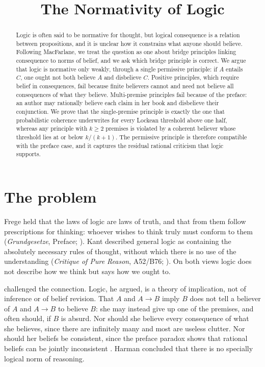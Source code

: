 \documentclass{situationist-preprint}
\title{The Normativity of Logic}
\begin{document}
\maketitle

\begin{abstract}
Logic is often said to be normative for thought, but logical consequence is a relation between propositions, and it is unclear how it constrains what anyone should believe. Following MacFarlane, we treat the question as one about bridge principles linking consequence to norms of belief, and we ask which bridge principle is correct. We argue that logic is normative only weakly, through a single permissive principle: if $A$ entails $C$, one ought not both believe $A$ and disbelieve $C$. Positive principles, which require belief in consequences, fail because finite believers cannot and need not believe all consequences of what they believe. Multi-premise principles fail because of the preface: an author may rationally believe each claim in her book and disbelieve their conjunction. We prove that the single-premise principle is exactly the one that probabilistic coherence underwrites for every Lockean threshold above one half, whereas any principle with $k \geq 2$ premises is violated by a coherent believer whose threshold lies at or below $k/(k+1)$. The permissive principle is therefore compatible with the preface case, and it captures the residual rational criticism that logic supports.
\end{abstract}

\section{The problem}

Frege held that the laws of logic are laws of truth, and that from them follow prescriptions for thinking: whoever wishes to think truly must conform to them (\emph{Grundgesetze}, Preface; \citealp{Frege1893}). Kant described general logic as containing the absolutely necessary rules of thought, without which there is no use of the understanding (\emph{Critique of Pure Reason}, A52/B76; \citealp{Kant1781}). On both views logic does not describe how we think but says how we ought to.

\citet{Harman1984,Harman1986} challenged the connection. Logic, he argued, is a theory of implication, not of inference or of belief revision. That $A$ and $A \rightarrow B$ imply $B$ does not tell a believer of $A$ and $A \rightarrow B$ to believe $B$: she may instead give up one of the premises, and often should, if $B$ is absurd. Nor should she believe every consequence of what she believes, since there are infinitely many and most are useless clutter. Nor should her beliefs be consistent, since the preface paradox shows that rational beliefs can be jointly inconsistent \citep{Makinson1965}. Harman concluded that there is no specially logical norm of reasoning.
\end{document}
